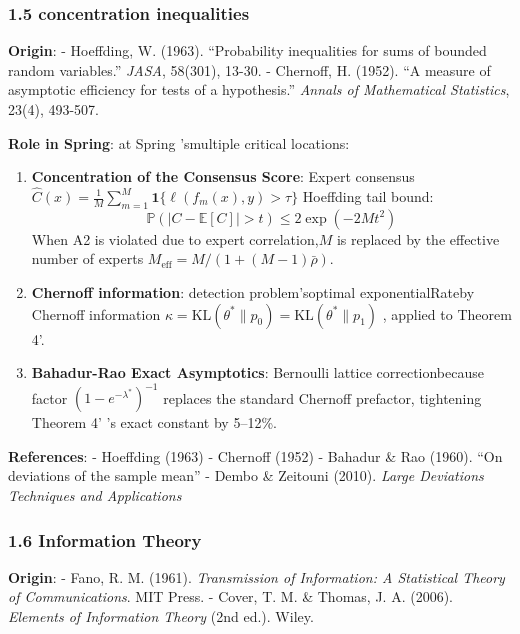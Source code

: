 \documentclass[
  12pt,
]{article}
\begin{document}
\subsubsection{1.5 concentration inequalities}\label{ux96c6ux4e2dux4e0dux7b49ux5f0f}

\textbf{Origin}: - Hoeffding, W. (1963). ``Probability inequalities for
sums of bounded random variables.'' \emph{JASA}, 58(301), 13-30. -
Chernoff, H. (1952). ``A measure of asymptotic efficiency for tests of a
hypothesis.'' \emph{Annals of Mathematical Statistics}, 23(4), 493-507.

\textbf{Role in Spring}: at  Spring 'smultiple critical locations: 

\begin{enumerate}
\def\labelenumi{\arabic{enumi}.}
\item
  \textbf{Concentration of the Consensus Score}: Expert consensus
  \(\hat{C}(x) = \frac{1}{M}\sum_{m=1}^M \mathbf{1}\{\ell(f_m(x), y) > \tau\}\)
  Hoeffding tail bound:
  \[\mathbb{P}(|C - \mathbb{E}[C]| > t) \leq 2\exp(-2M t^2)\] When A2
  is violated due to expert correlation,\(M\) is replaced by the effective number of experts
  \(M_{\text{eff}} = M/(1 + (M-1)\bar{\rho})\). 
\item
  \textbf{Chernoff information}: detection problem'soptimal exponentialRateby  Chernoff information
  \(\kappa = \text{KL}(\theta^*\|p_0) = \text{KL}(\theta^*\|p_1)\)
  , applied to Theorem 4'.
\item
  \textbf{Bahadur-Rao Exact Asymptotics}: Bernoulli lattice correctionbecause factor 
  \((1-e^{-\lambda^*})^{-1}\) replaces the standard Chernoff prefactor, tightening Theorem 4'
  's exact constant by 5--12\%.
\end{enumerate}

\textbf{References}: - Hoeffding (1963) - Chernoff (1952) - Bahadur \& Rao
(1960). ``On deviations of the sample mean'' - Dembo \& Zeitouni (2010).
\emph{Large Deviations Techniques and Applications}

\subsubsection{1.6 Information Theory}\label{ux4fe1ux606fux8bba}

\textbf{Origin}: - Fano, R. M. (1961). \emph{Transmission of Information:
A Statistical Theory of Communications}. MIT Press. - Cover, T. M. \&
Thomas, J. A. (2006). \emph{Elements of Information Theory} (2nd ed.).
Wiley.
\end{document}
